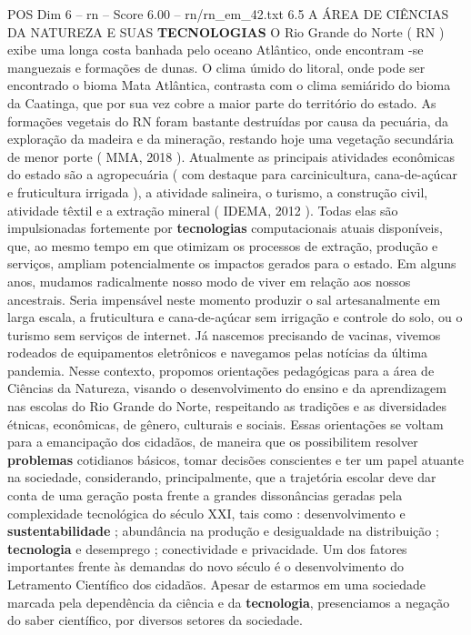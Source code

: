\begin{textsample}{POS Dim 6 – rn – Score 6.00 – rn/rn\_em\_42.txt}  \label{ex:f6_pos_236}
6.5 A ÁREA DE CIÊNCIAS DA NATUREZA E SUAS \textbf{TECNOLOGIAS} O Rio Grande do Norte ( RN ) exibe uma longa costa banhada pelo oceano Atlântico, onde encontram -se manguezais e formações de dunas.
O clima úmido do litoral, onde pode ser encontrado o bioma Mata Atlântica, contrasta com o clima semiárido do bioma da Caatinga, que por sua vez cobre a maior parte do território do estado.
As formações vegetais do RN foram bastante destruídas por causa da pecuária, da exploração da madeira e da mineração, restando hoje uma vegetação secundária de menor porte ( MMA, 2018 ).
Atualmente as principais atividades econômicas do estado são a agropecuária ( com destaque para carcinicultura, cana-de-açúcar e fruticultura irrigada ), a atividade salineira, o turismo, a construção civil, atividade têxtil e a extração mineral ( IDEMA, 2012 ).
Todas elas são impulsionadas fortemente por \textbf{tecnologias} computacionais atuais disponíveis, que, ao mesmo tempo em que otimizam os processos de extração, produção e serviços, ampliam potencialmente os impactos gerados para o estado.
Em alguns anos, mudamos radicalmente nosso modo de viver em relação aos nossos ancestrais.
Seria impensável neste momento produzir o sal artesanalmente em larga escala, a fruticultura e cana-de-açúcar sem irrigação e controle do solo, ou o turismo sem serviços de internet.
Já nascemos precisando de vacinas, vivemos rodeados de equipamentos eletrônicos e navegamos pelas notícias da última pandemia.
Nesse contexto, propomos orientações pedagógicas para a área de Ciências da Natureza, visando o desenvolvimento do ensino e da aprendizagem nas escolas do Rio Grande do Norte, respeitando as tradições e as diversidades étnicas, econômicas, de gênero, culturais e sociais.
Essas orientações se voltam para a emancipação dos cidadãos, de maneira que os possibilitem resolver \textbf{problemas} cotidianos básicos, tomar decisões conscientes e ter um papel atuante na sociedade, considerando, principalmente, que a trajetória escolar deve dar conta de uma geração posta frente a grandes dissonâncias geradas pela complexidade tecnológica do século XXI, tais como : desenvolvimento e \textbf{sustentabilidade} ; abundância na produção e desigualdade na distribuição ; \textbf{tecnologia} e desemprego ; conectividade e privacidade.
Um dos fatores importantes frente às demandas do novo século é o desenvolvimento do Letramento Científico dos cidadãos.
Apesar de estarmos em uma sociedade marcada pela dependência da ciência e da \textbf{tecnologia}, presenciamos a negação do saber científico, por diversos setores da sociedade.

\end{textsample}
